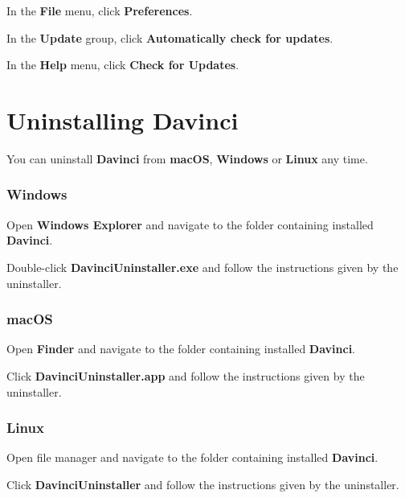 \begin{boxitemize}
	\item In the \textbf{File} menu, click \textbf{Preferences}.
	\item In the \textbf{Update} group, click \textbf{Automatically check for updates}.
	\item In the \textbf{Help} menu, click \textbf{Check for Updates}.
\end{boxitemize}

\section{Uninstalling Davinci}

You can uninstall \textbf{Davinci} from \textbf{macOS}, \textbf{Windows} or \textbf{Linux} any time.

\subsubsection{Windows}

\begin{boxitemize}
	\item Open \textbf{Windows Explorer} and navigate to the folder containing installed \textbf{Davinci}.
	\item Double-click \textbf{DavinciUninstaller.exe} and follow the instructions given by the uninstaller.
\end{boxitemize}

\subsubsection{macOS}

\begin{boxitemize}
	\item Open \textbf{Finder} and navigate to the folder containing installed \textbf{Davinci}.
	\item Click \textbf{DavinciUninstaller.app} and follow the instructions given by the uninstaller.
\end{boxitemize}

\subsubsection{Linux}

\begin{boxitemize}
	\item Open file manager and navigate to the folder containing installed \textbf{Davinci}.
	\item Click \textbf{DavinciUninstaller} and follow the instructions given by the uninstaller.
\end{boxitemize}

